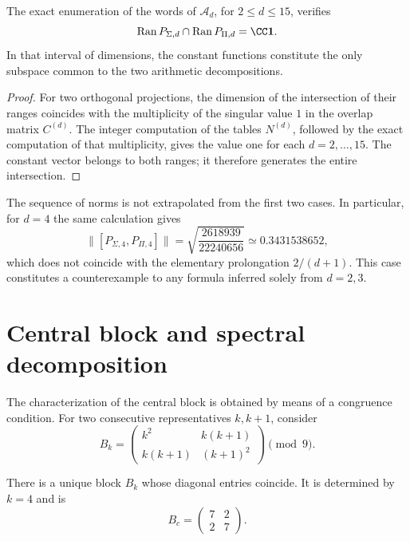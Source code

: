 \begin{proposition}
\label{prop:app-interseccion-proyectores}
The exact enumeration of the words of \(\mathscr A_d\), for
\(2\leq d\leq15\), verifies
\[
 \operatorname{Ran}P_{\Sigma,d}\cap
 \operatorname{Ran}P_{\Pi,d}
 =\CC\mathbf 1.
\]
In that interval of dimensions, the constant functions constitute the
only subspace common to the two arithmetic decompositions.
\end{proposition}

\begin{proof}
For two orthogonal projections, the dimension of the intersection of their ranges coincides with the multiplicity of the singular value \(1\) in the overlap matrix \(C^{(d)}\). The integer computation of the tables \(N^{(d)}\), followed by the exact computation of that multiplicity, gives the value one for each \(d=2,\ldots,15\). The constant vector belongs to both ranges; it therefore generates the entire intersection.
\end{proof}

The sequence of norms is not extrapolated from the first two cases.
In particular, for \(d=4\) the same calculation gives
\[
 \|[P_{\Sigma,4},P_{\Pi,4}]\|
 =\sqrt{\frac{2618939}{22240656}}
 \simeq0.3431538652,
\]
which does not coincide with the elementary prolongation \(2/(d+1)\). This case
constitutes a counterexample to any formula inferred solely from
\(d=2,3\).

\section{Central block and spectral decomposition}

The characterization of the central block is obtained by means of a
congruence condition. For two consecutive representatives \(k,k+1\), consider
\[
B_k=
\begin{pmatrix}
k^2&k(k+1)\\
k(k+1)&(k+1)^2
\end{pmatrix}\pmod9.
\]

\begin{theorem}
\label{thm:app-bloque-central}
There is a unique block \(B_k\) whose diagonal entries coincide. It is
determined by \(k=4\) and is
\[
B_c=
\begin{pmatrix}7&2\\2&7\end{pmatrix}.
\]
\end{theorem}


